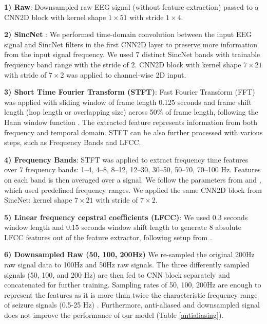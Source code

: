 \documentclass[pmlr,twocolumn,10pt]{jmlr}
\begin{document}
\noindent\textbf{1) Raw}: Downsampled raw EEG signal (without feature extraction) passed to a CNN2D block with kernel shape $1 \times 51$ with stride $1 \times 4$.

\noindent\textbf{2) SincNet} \citep{ravanelli2018speaker}: We performed time-domain convolution between the input EEG signal and SincNet filters in the first CNN2D layer to preserve more information from the input signal frequency. We used $7$ distinct SincNet bands with trainable frequency band range with the stride of $2$. CNN2D block with kernel shape $7 \times 21$ with stride of $7 \times 2$ was applied to channel-wise 2D input.

\noindent\textbf{3) Short Time Fourier Transform (STFT)}: Fast Fourier Transform (FFT) was applied with sliding window of frame length 0.125 seconds and frame shift length (hop length or overlapping size) across 50\% of frame length, following the Hann window function \citep{oppenheim1999discrete}. The extracted feature represents information from both frequency and temporal domain. STFT can be also further processed with various steps, such as Frequency Bands and LFCC.


\noindent\textbf{4) Frequency Bands}: STFT was applied to extract frequency time features over $7$ frequency bands: 1–4, 4–8, 8–12, 12–30, 30–50, 50–70, 70–100 Hz.
Features on each band is then averaged over a signal.
We follow the parameters from \cite{liu2019epileptic} and \cite{mirowski2009classification}, which used predefined frequency ranges. We applied the same CNN2D block from SincNet: kernel shape $7 \times 21$ with stride of $7 \times 2$. 

\noindent\textbf{5) Linear frequency cepstral coefficients (LFCC)}: We used 0.3 seconds window length and 0.15 seconds window shift length to generate 8 absolute LFCC features out of the feature extractor, following setup from \cite{shawki2020deep}.

\noindent\textbf{6) Downsampled Raw (50, 100, 200Hz)} We re-sampled the original 200Hz raw signal data to 100Hz and 50Hz raw signals. The three differently sampled signals (50, 100, and 200 Hz) are then fed to CNN block separately and concatenated for further training. Sampling rates of 50, 100, 200Hz are enough to represent the features as it is more than twice the characteristic frequency range of seizure signals (0.5-25 Hz) \citep{shoeb2009application}. Furthermore, anti-aliased and downsampled signal does not improve the performance of our model (Table \ref{antialiasing}). 
\end{document}
